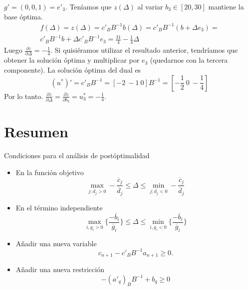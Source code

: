 \documentclass[PM.tex]{subfiles}
\begin{document}
\begin{example}
$g'=(0,0,1)=e'_3$. Teníamos que $z(\Delta)$ al variar $b_3\in [20,30]$ mantiene la base óptima.
\begin{gather*}
f(\Delta)= z(\Delta)=c'_B B^{-1}b(\Delta)=c'_B B^{-1}(b+\Delta e_3)=\\
c'_B B^{-1} b +\Delta c'_B B^{-1} e_3 =\frac{31}{4}-\frac{1}{4}\Delta
\end{gather*}
Luego $\frac{\partial z}{\partial\Delta}=-\frac{1}{4}$. Si quisiéramos utilizar el resultado anterior, tendríamos que obtener la solución óptima y multiplicar por $e_3$ (quedarnos con la tercera componente). La solución óptima del dual es
\[(u^*)'=c'_B B^{-1}=[-2\ -1\ 0]B^{-1}=[-\frac{1}{2}\ 0\ -\frac{1}{4}]\]
Por lo tanto. $\frac{\partial z}{\partial\Delta}=\frac{\partial z}{\partial b_3}=u^*_3=-\frac{1}{4}$.
\end{example}
\newpage
\section{Resumen}
Condiciones para el análisis de postóptimalidad
\begin{itemize}
\item En la función objetivo
\[
\max_{j:\overline{d}_j >0}-\frac{\overline{c}_j}{\overline{d}_j} \leq \Delta \leq \min_{j:\overline{d}_j <0}-\frac{\overline{c}_j}{\overline{d}_j}
\]
\item En el término independiente
\[\max_{i, g_i>0}\{\frac{-\overline{b}_i}{\overline{g}_i}\}\leq\Delta \leq \min_{i,g_i<0}\{\frac{-\overline{b}_i}{\overline{g}_i}\}\]
\item Añadir una nueva variable
\[c_{n+1}-c'_B B^{-1} a_{n+1}\geq 0.\]
\item Añadir una nueva restricción
\[-(a'_q)_B B^{-1}+b_q\geq 0\]
\end{itemize}



\end{document}
